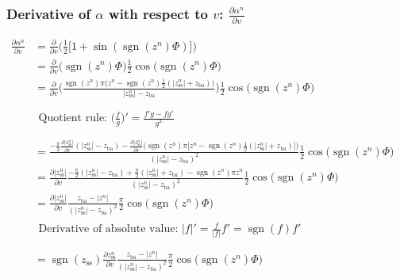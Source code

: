 \documentclass{article}
\DeclareMathOperator{\sgn}{sgn}
\begin{document}
\subsubsection*{Derivative of $\alpha$ with respect to $v$: $\frac{\partial \alpha^n}{\partial v}$}
\begin{equation}
    \begin{aligned}
        \frac{\partial \alpha^n}{\partial v} &= \frac{\partial}{\partial v}\Bigg(\frac{1}{2}\big[1+\sin(\sgn(z^n)\Phi)\big]\Bigg)\\
        &= \frac{\partial}{\partial v}\Big(\sgn(z^n)\Phi\Big)\frac{1}{2}\cos\big(\sgn(z^n)\Phi\big)\\
        &= \frac{\partial}{\partial v}\Bigg(\frac{\sgn(z^n)\pi\big(z^n-\sgn(z^n)\frac{1}{2}(|z_\text{ss}^n|+z_\text{ba})\big)}{|z_\text{ss}^n|-z_\text{ba}}\Bigg)\frac{1}{2}\cos\big(\sgn(z^n)\Phi\big)\\
        &\\
        &\begin{gathered}
        \text{Quotient rule: }\boxed{\Bigg(\frac{f}{g}\Bigg)' = \frac{f'g - fg'}{g^2}}
        \end{gathered}
        \\
        &\\
        &= \frac{-\frac{\pi}{2}\frac{\partial |z_\text{ss}^n|}{\partial v}(|z_\text{ss}^n|-z_\text{ba}) - \frac{\partial |z_\text{ss}^n|}{\partial v}\Big(\sgn(z^n)\pi\big[z^n-\sgn(z^n)\frac{1}{2}(|z_\text{ss}^n|+z_\text{ba})\Big]\bigg)}{(|z_\text{ss}^n| - z_\text{ba})^2}\frac{1}{2}\cos\big(\sgn(z^n)\Phi\big)\\
        &= \frac{\partial |z_\text{ss}^n|}{\partial v}\frac{-\frac{\pi}{2}(|z_\text{ss}^n|-z_\text{ba}) + \frac{\pi}{2}(|z_\text{ss}^n|+z_\text{ba})-\sgn(z^n)\pi z^n}{(|z_\text{ss}^n| - z_\text{ba})^2}\frac{1}{2}\cos\big(\sgn(z^n)\Phi\big)\\
        &= \frac{\partial |z_\text{ss}^n|}{\partial v}\frac{z_\text{ba} - |z^n|}{(|z_\text{ss}^n| - z_\text{ba})^2}\frac{\pi}{2}\cos\big(\sgn(z^n)\Phi\big)
        &\\
        &\begin{gathered}
        \text{Derivative of absolute value: }\boxed{|f|' = \frac{f}{|f|}f'= \sgn(f)f'}
        \end{gathered}
        \\
        &\\
        &=\sgn(z_\text{ss})\frac{\partial z_\text{ss}^n}{\partial v}\frac{z_\text{ba} - |z^n|}{(|z_\text{ss}^n| - z_\text{ba})^2}\frac{\pi}{2}\cos\big(\sgn(z^n)\Phi\big)
    \end{aligned}
\end{equation}
\end{document}
